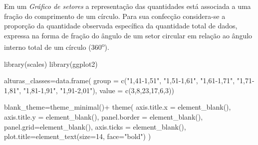 \documentclass[
]{book}
\newenvironment{Shaded}{\begin{snugshade}}{\end{snugshade}}
\newcommand{\AttributeTok}[1]{\textcolor[rgb]{0.77,0.63,0.00}{#1}}
\newcommand{\DecValTok}[1]{\textcolor[rgb]{0.00,0.00,0.81}{#1}}
\newcommand{\FunctionTok}[1]{\textcolor[rgb]{0.00,0.00,0.00}{#1}}
\newcommand{\NormalTok}[1]{#1}
\newcommand{\OtherTok}[1]{\textcolor[rgb]{0.56,0.35,0.01}{#1}}
\newcommand{\SpecialCharTok}[1]{\textcolor[rgb]{0.00,0.00,0.00}{#1}}
\newcommand{\StringTok}[1]{\textcolor[rgb]{0.31,0.60,0.02}{#1}}
\begin{document}
\hfill\break

Em um \emph{Gráfico de setores} a representação das quantidades está associada a uma fração do comprimento de um círculo. Para sua confecção considera-se a proporção da quantidade observada específica da quantidade total de dados, expressa na forma de fração do ângulo de um setor circular em relação ao ângulo interno total de um círculo (360\textsuperscript{o}).

\hfill\break
\hfill\break

\begin{Shaded}
\begin{Highlighting}[]
\FunctionTok{library}\NormalTok{(scales)}
\FunctionTok{library}\NormalTok{(ggplot2)}

\NormalTok{alturas\_classes}\OtherTok{=}\FunctionTok{data.frame}\NormalTok{(}
  \AttributeTok{group =} \FunctionTok{c}\NormalTok{(}\StringTok{"1,41{-}1,51"}\NormalTok{,}
            \StringTok{"1,51{-}1,61"}\NormalTok{,}
            \StringTok{"1,61{-}1,71"}\NormalTok{,}
            \StringTok{"1,71{-}1,81"}\NormalTok{,}
            \StringTok{"1,81{-}1,91"}\NormalTok{,}
            \StringTok{"1,91{-}2,01"}\NormalTok{),}
  \AttributeTok{value =} \FunctionTok{c}\NormalTok{(}\DecValTok{3}\NormalTok{,}\DecValTok{8}\NormalTok{,}\DecValTok{23}\NormalTok{,}\DecValTok{17}\NormalTok{,}\DecValTok{6}\NormalTok{,}\DecValTok{3}\NormalTok{))}

\NormalTok{blank\_theme}\OtherTok{=}\FunctionTok{theme\_minimal}\NormalTok{()}\SpecialCharTok{+}
  \FunctionTok{theme}\NormalTok{(}
    \AttributeTok{axis.title.x =} \FunctionTok{element\_blank}\NormalTok{(),}
    \AttributeTok{axis.title.y =} \FunctionTok{element\_blank}\NormalTok{(),}
    \AttributeTok{panel.border =} \FunctionTok{element\_blank}\NormalTok{(),}
    \AttributeTok{panel.grid=}\FunctionTok{element\_blank}\NormalTok{(),}
    \AttributeTok{axis.ticks =} \FunctionTok{element\_blank}\NormalTok{(),}
    \AttributeTok{plot.title=}\FunctionTok{element\_text}\NormalTok{(}\AttributeTok{size=}\DecValTok{14}\NormalTok{, }\AttributeTok{face=}\StringTok{"bold"}\NormalTok{)}
\NormalTok{  )}


\end{Highlighting}
\end{Shaded}
\end{document}
